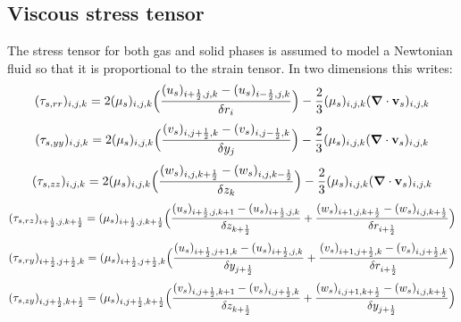 \subsection{Viscous stress tensor}

The stress tensor for both gas and solid phases is assumed to model a Newtonian fluid
so that it is proportional to the strain tensor. In two dimensions this writes:\\

\begin{eqnarray}
\htmlimage{}
(\tau_{s,rr})_{i,j,k} = 2 (\mu_s)_{i,j,k} 
\Big( \frac{(u_s)_{i+\frac{1}{2},j,k} - (u_s)_{i-\frac{1}{2},j,k}}
{\delta r_{i}} \Big ) - \frac{2}{3} (\mu_s)_{i,j,k} 
(\mbox{\boldmath $\nabla$} \cdot {\bf v}_s)_{i,j,k}
\nonumber
\end{eqnarray}
%
\begin{eqnarray}
\htmlimage{}
(\tau_{s,yy})_{i,j,k} = 2 (\mu_s)_{i,j,k} 
\Big( \frac{(v_s)_{i,j+\frac{1}{2},k} - (v_s)_{i,j-\frac{1}{2},k}}
{\delta y_{j}} \Big ) - \frac{2}{3} (\mu_s)_{i,j,k} 
(\mbox{\boldmath $\nabla$} \cdot {\bf v}_s)_{i,j,k}
\nonumber
\end{eqnarray}
%
\begin{eqnarray}
\htmlimage{}
(\tau_{s,zz})_{i,j,k} = 2 (\mu_s)_{i,j,k} 
\Big( \frac{(w_s)_{i,j,k+\frac{1}{2}} -(w_s)_{i,j,k-\frac{1}{2}}}
{\delta z_k} \Big ) - \frac{2}{3} (\mu_s)_{i,j,k} 
(\mbox{\boldmath $\nabla$} \cdot {\bf v}_s)_{i,j,k}
\nonumber
\end{eqnarray}
%
\begin{eqnarray}
\htmlimage{}
(\tau_{s,rz})_{i+\frac{1}{2},j,k+\frac{1}{2}} = (\mu_s)_{i+\frac{1}{2},j,k+\frac{1}{2}} 
\Big( \frac{(u_s)_{i+\frac{1}{2},j,k+1} -(u_s)_{i+\frac{1}{2},j,k}}
{\delta z_{k+\frac{1}{2}}} +
\frac{(w_s)_{i+1,j,k+\frac{1}{2}} -(w_s)_{i,j,k+\frac{1}{2}}}
{\delta r_{i+\frac{1}{2}}} \Big )
\nonumber
\end{eqnarray}
%
\begin{eqnarray}
\htmlimage{}
(\tau_{s,ry})_{i+\frac{1}{2},j+\frac{1}{2},k} = (\mu_s)_{i+\frac{1}{2},j+\frac{1}{2},k} 
\Big( \frac{(u_s)_{i+\frac{1}{2},j+1,k} -(u_s)_{i+\frac{1}{2},j,k}}
{\delta y_{j+\frac{1}{2}}} +
\frac{(v_s)_{i+1,j+\frac{1}{2},k} -(v_s)_{i,j+\frac{1}{2},k}}
{\delta r_{i+\frac{1}{2}}} \Big )
\nonumber
\end{eqnarray}
%
\begin{eqnarray}
\htmlimage{}
(\tau_{s,zy})_{i,j+\frac{1}{2},k+\frac{1}{2}} = (\mu_s)_{i,j+\frac{1}{2},k+\frac{1}{2}} 
\Big( \frac{(v_s)_{i,j+\frac{1}{2},k+1} -(v_s)_{i,j+\frac{1}{2},k}}
{\delta z_{k+\frac{1}{2}}} +
\frac{(w_s)_{i,j+1,k+\frac{1}{2}} -(w_s)_{i,j,k+\frac{1}{2}}}
{\delta y_{j+\frac{1}{2}}} \Big )
\nonumber
\end{eqnarray}
